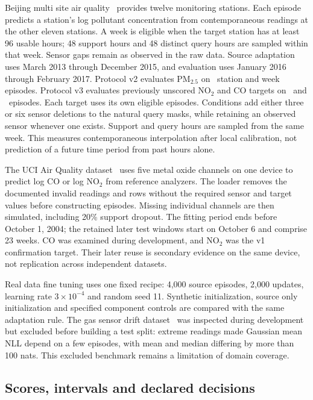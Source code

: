 Beijing multi site air quality~\citep{zhang2017beijing} provides twelve monitoring stations. Each episode predicts a station's log pollutant concentration from contemporaneous readings at the other eleven stations. A week is eligible when the target station has at least 96 usable hours; 48 support hours and 48 distinct query hours are sampled within that week. Sensor gaps remain as observed in the raw data. Source adaptation uses March 2013 through December 2015, and evaluation uses January 2016 through February 2017. Protocol v2 evaluates PM$_{2.5}$ on \Rbeijingepisodes\ station and week episodes. Protocol v3 evaluates previously unscored NO$_2$ and CO targets on \VthreebeijingnoTwoepisodes\ and \Vthreebeijingcoepisodes\ episodes. Each target uses its own eligible episodes. Conditions add either three or six sensor deletions to the natural query masks, while retaining an observed sensor whenever one exists. Support and query hours are sampled from the same week. This measures contemporaneous interpolation after local calibration, not prediction of a future time period from past hours alone.

The UCI Air Quality dataset~\citep{devito2008airquality} uses five metal oxide channels on one device to predict log CO or log NO$_2$ from reference analyzers. The loader removes the documented invalid readings and rows without the required sensor and target values before constructing episodes. Missing individual channels are then simulated, including 20\% support dropout. The fitting period ends before October 1, 2004; the retained later test windows start on October 6 and comprise 23 weeks. CO was examined during development, and NO$_2$ was the v1 confirmation target. Their later reuse is secondary evidence on the same device, not replication across independent datasets.

Real data fine tuning uses one fixed recipe: 4,000 source episodes, 2,000 updates, learning rate $3\times10^{-4}$ and random seed 11. Synthetic initialization, source only initialization and specified component controls are compared with the same adaptation rule. The gas sensor drift dataset~\citep{vergara2012drift} was inspected during development but excluded before building a test split: extreme readings made Gaussian mean NLL depend on a few episodes, with mean and median differing by more than 100 nats. This excluded benchmark remains a limitation of domain coverage.

\subsection{Scores, intervals and declared decisions}

